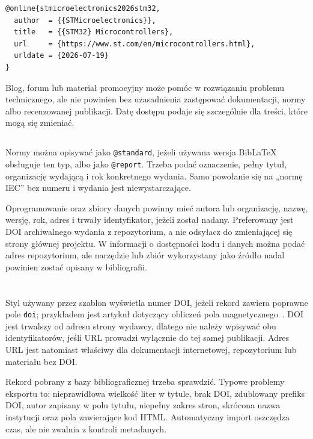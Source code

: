 \begin{lstlisting}[style=thesis,caption={Przykładowy opis oficjalnej dokumentacji internetowej},label={lst:bib-online}]
@online{stmicroelectronics2026stm32,
  author  = {{STMicroelectronics}},
  title   = {{STM32} Microcontrollers},
  url     = {https://www.st.com/en/microcontrollers.html},
  urldate = {2026-07-19}
}
\end{lstlisting}

Blog, forum lub materiał promocyjny może pomóc w rozwiązaniu problemu technicznego, ale nie powinien bez uzasadnienia zastępować dokumentacji, normy albo recenzowanej publikacji. Datę dostępu podaje się szczególnie dla treści, które mogą się zmieniać.

\subsection{}

Normy można opisywać jako \texttt{@standard}, jeżeli używana wersja BibLaTeX obsługuje ten typ, albo jako \texttt{@report}. Trzeba podać oznaczenie, pełny tytuł, organizację wydającą i rok konkretnego wydania. Samo powołanie się na „normę IEC” bez numeru i wydania jest niewystarczające.

Oprogramowanie oraz zbiory danych powinny mieć autora lub organizację, nazwę, wersję, rok, adres i trwały identyfikator, jeżeli został nadany. Preferowany jest DOI archiwalnego wydania z repozytorium, a nie odsyłacz do zmieniającej się strony głównej projektu. W informacji o dostępności kodu i danych można podać adres repozytorium, ale narzędzie lub zbiór wykorzystany jako źródło nadal powinien zostać opisany w bibliografii.

\section{}

Styl używany przez szablon wyświetla numer DOI, jeżeli rekord zawiera poprawne pole \texttt{doi}; przykładem jest artykuł dotyczący obliczeń pola magnetycznego~\cite{5424046}. DOI jest trwalszy od adresu strony wydawcy, dlatego nie należy wpisywać obu identyfikatorów, jeśli URL prowadzi wyłącznie do tej samej publikacji. Adres URL jest natomiast właściwy dla dokumentacji internetowej, repozytorium lub materiału bez DOI.

Rekord pobrany z bazy bibliograficznej trzeba sprawdzić. Typowe problemy eksportu to: nieprawidłowa wielkość liter w tytule, brak DOI, zdublowany prefiks DOI, autor zapisany w polu tytułu, niepełny zakres stron, skrócona nazwa instytucji oraz pola zawierające kod HTML. Automatyczny import oszczędza czas, ale nie zwalnia z kontroli metadanych.

